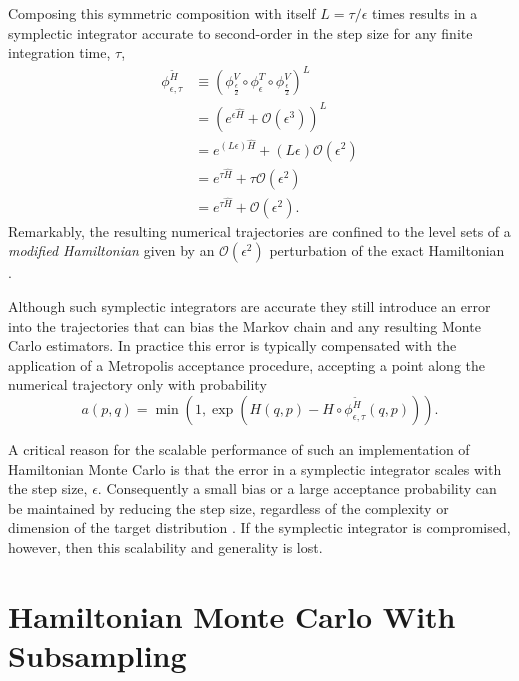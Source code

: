 \documentclass{article}
\begin{document}
%
Composing this symmetric composition with itself $L = \tau / \epsilon$ times results in 
a symplectic integrator accurate to second-order in the step size for any finite integration 
time, $\tau$,
%
\begin{align*}
\phi^{\widetilde{H}}_{\epsilon, \tau}
&\equiv
\left( \phi^{V}_{\frac{\epsilon}{2}} \circ 
\phi^{T}_{\epsilon} \circ 
\phi^{V}_{\frac{\epsilon}{2}} \right)^{L}
\\
&=
\left( e^{ \epsilon \hat{H} }
+ \mathcal{O} \! \left( \epsilon^{3} \right) \right)^{L}
\\
&=
e^{ \left( L \epsilon \right) \hat{H} }
+ \left( L \epsilon \right) \mathcal{O} \! \left( \epsilon^{2} \right)
\\
&=
e^{ \tau \hat{H} }
+ \tau \mathcal{O} \! \left( \epsilon^{2} \right)
\\
&=
e^{ \tau \hat{H} }
+ \mathcal{O} \! \left( \epsilon^{2} \right).
\end{align*}
%
Remarkably, the resulting numerical trajectories are confined to the level sets
of a \textit{modified Hamiltonian} given by an $\mathcal{O} \! \left( \epsilon^{2} \right)$
perturbation of the exact Hamiltonian \cite{HairerEtAl:2006, BetancourtEtAl:2014b}.

Although such symplectic integrators are accurate they still introduce an
error into the trajectories that can bias the Markov chain and any resulting
Monte Carlo estimators.  In practice this error is typically compensated with
the application of a Metropolis acceptance procedure, accepting a point along
the numerical trajectory only with probability
%
\begin{equation*}
a (p, q) = \min \left(1, 
\exp \! \left( H (q, p) - H \circ \phi^{\widetilde{H}}_{\epsilon, \tau} (q, p) \right) \right).
\end{equation*}

A critical reason for the scalable performance of such an implementation of 
Hamiltonian Monte Carlo is that the error in a symplectic integrator scales 
with the step size, $\epsilon$.  Consequently a small bias or a large acceptance 
probability can be maintained by reducing the step size, regardless of the complexity
or dimension of the target distribution \cite{BetancourtEtAl:2014b}.  If the symplectic
integrator is compromised, however, then this scalability and generality is lost.

\section{Hamiltonian Monte Carlo With Subsampling}
\end{document}
